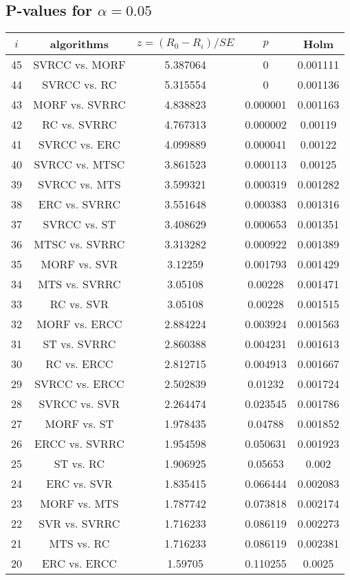 \documentclass[a4paper,10pt]{article}
\begin{document}
\begin{landscape}
\subsection{P-values for $\alpha=0.05$}

\begin{table}[!htp]
\centering\scriptsize
\begin{tabular}{ccccc}
$i$&algorithms&$z=(R_0 - R_i)/SE$&$p$&Holm\\
\hline45&SVRCC vs. MORF&5.387064&0&0.001111\\
44&SVRCC vs. RC&5.315554&0&0.001136\\
43&MORF vs. SVRRC&4.838823&0.000001&0.001163\\
42&RC vs. SVRRC&4.767313&0.000002&0.00119\\
41&SVRCC vs. ERC&4.099889&0.000041&0.00122\\
40&SVRCC vs. MTSC&3.861523&0.000113&0.00125\\
39&SVRCC vs. MTS&3.599321&0.000319&0.001282\\
38&ERC vs. SVRRC&3.551648&0.000383&0.001316\\
37&SVRCC vs. ST&3.408629&0.000653&0.001351\\
36&MTSC vs. SVRRC&3.313282&0.000922&0.001389\\
35&MORF vs. SVR&3.12259&0.001793&0.001429\\
34&MTS vs. SVRRC&3.05108&0.00228&0.001471\\
33&RC vs. SVR&3.05108&0.00228&0.001515\\
32&MORF vs. ERCC&2.884224&0.003924&0.001563\\
31&ST vs. SVRRC&2.860388&0.004231&0.001613\\
30&RC vs. ERCC&2.812715&0.004913&0.001667\\
29&SVRCC vs. ERCC&2.502839&0.01232&0.001724\\
28&SVRCC vs. SVR&2.264474&0.023545&0.001786\\
27&MORF vs. ST&1.978435&0.04788&0.001852\\
26&ERCC vs. SVRRC&1.954598&0.050631&0.001923\\
25&ST vs. RC&1.906925&0.05653&0.002\\
24&ERC vs. SVR&1.835415&0.066444&0.002083\\
23&MORF vs. MTS&1.787742&0.073818&0.002174\\
22&SVR vs. SVRRC&1.716233&0.086119&0.002273\\
21&MTS vs. RC&1.716233&0.086119&0.002381\\
20&ERC vs. ERCC&1.59705&0.110255&0.0025\\

\end{tabular}
\end{table}
\end{landscape}
\end{document}
